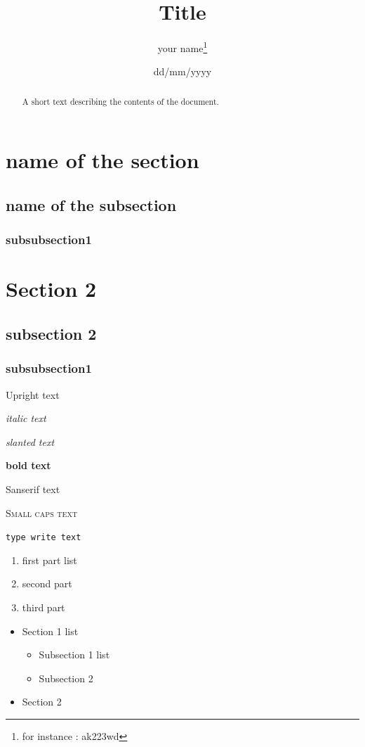 \documentclass{article}
\title{Title}
\author{your name\thanks{for instance : ak223wd}}
\date{dd/mm/yyyy}
\begin{document}
\maketitle
\tableofcontents
\section{name of the section}
\subsection{name of the subsection}
\subsubsection{subsubsection1}
\section{Section 2}
\subsection{subsection 2}
\subsubsection{subsubsection1}

\textup{Upright text}

\textit{italic text}

\textsl{slanted text}

\textbf{bold text}

\textsf{Sanserif text}

\textsc{Small caps text}

\texttt{type write text}

\begin{abstract}
A short text describing the contents of the document. 
\end{abstract}

\begin{enumerate}
\item first part list 
\item second part
\item third part
\end{enumerate}

\begin{itemize}
\item Section 1 list
\begin {itemize}
\item Subsection 1 list 
\item Subsection 2
\end{itemize}
\item Section 2
\end {itemize} 
\end{document}
